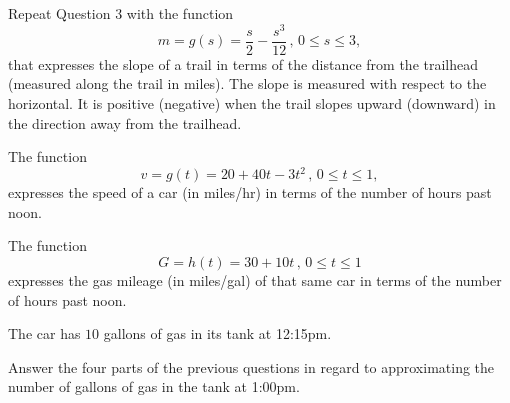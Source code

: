 \documentclass{ximera}
\begin{document}
\begin{question}  \label{Q9er34rre}
Repeat Question 3 with the function
\[
   m = g(s) = \frac{s}{2} - \frac{s^3}{12} \, , \, 0\leq s \leq 3 ,
\]
that expresses the slope of a trail in terms of the distance from the trailhead (measured along the trail in miles). The slope is measured with respect to the horizontal. It is positive (negative) when the trail slopes upward (downward) in the direction away from the trailhead.
\end{question}


\begin{question} \label{Q8fre}
The function
\[
      v = g(t) = 20+  40t - 3t^2 \, , \, 0\leq t\leq 1 ,
\]
expresses the speed of a car (in miles/hr) in terms of the number of hours past noon.

The function 
\[
    G = h(t) = 30 + 10t  \, , \, 0\leq t\leq 1
\]
expresses the gas mileage (in miles/gal) of that same car in terms of the number of hours past noon.

The car has $10$ gallons of gas in its tank at 12:15pm.

Answer the four parts of the previous questions in regard to approximating the number of gallons of gas in the tank at 1:00pm.


\end{question}
\end{document}
